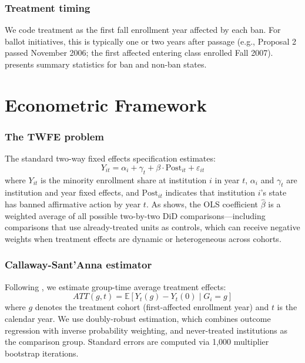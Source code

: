 \documentclass[12pt]{article}
\newcommand{\E}{\mathbb{E}}
\begin{document}
\subsubsection*{Treatment timing} We code treatment as the first fall enrollment year affected by each ban. For ballot initiatives, this is typically one or two years after passage (e.g., Proposal 2 passed November 2006; the first affected entering class enrolled Fall 2007).  presents summary statistics for ban and non-ban states.




\section{Econometric Framework}
\label{sec:method}

\subsubsection*{The TWFE problem} The standard two-way fixed effects specification estimates:
\begin{equation}
  Y_{it} = \alpha_i + \gamma_t + \beta \cdot \text{Post}_{it} + \varepsilon_{it}
  \label{eq:twfe}
\end{equation}
where $Y_{it}$ is the minority enrollment share at institution $i$ in year $t$, $\alpha_i$ and $\gamma_t$ are institution and year fixed effects, and $\text{Post}_{it}$ indicates that institution $i$'s state has banned affirmative action by year $t$. As \citet{goodman2021difference} shows, the OLS coefficient $\hat{\beta}$ is a weighted average of all possible two-by-two DiD comparisons---including comparisons that use already-treated units as controls, which can receive negative weights when treatment effects are dynamic or heterogeneous across cohorts.

\subsubsection*{Callaway-Sant'Anna estimator} Following \citet{callaway2021difference}, we estimate group-time average treatment effects:
\begin{equation}
  ATT(g,t) = \E[Y_t(g) - Y_t(0) \mid G_i = g]
\end{equation}
where $g$ denotes the treatment cohort (first-affected enrollment year) and $t$ is the calendar year. We use doubly-robust estimation, which combines outcome regression with inverse probability weighting, and never-treated institutions as the comparison group. Standard errors are computed via 1,000 multiplier bootstrap iterations.
\end{document}
